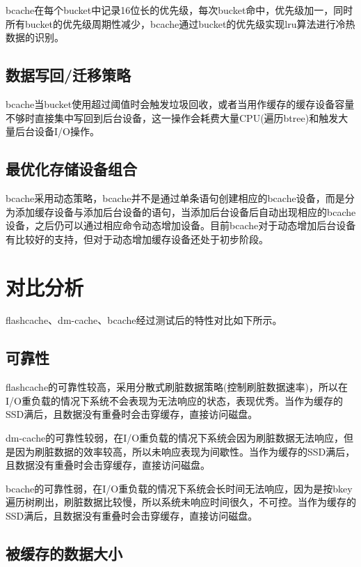 bcache在每个bucket中记录16位长的优先级，每次bucket命中，优先级加一，同时所有bucket的优先级周期性减少，bcache通过bucket的优先级实现lru算法进行冷热数据的识别。

\subsection{数据写回/迁移策略}

bcache当bucket使用超过阈值时会触发垃圾回收，或者当用作缓存的缓存设备容量不够时直接集中写回到后台设备，这一操作会耗费大量CPU(遍历btree)和触发大量后台设备I/O操作。

\subsection{最优化存储设备组合}

bcache采用动态策略，bcache并不是通过单条语句创建相应的bcache设备，而是分为添加缓存设备与添加后台设备的语句，当添加后台设备后自动出现相应的bcache设备，之后仍可以通过相应命令动态增加设备。目前bcache对于动态增加后台设备有比较好的支持，但对于动态增加缓存设备还处于初步阶段。

\section{对比分析}

flashcache、dm-cache、bcache经过测试后的特性对比如下所示。

\subsection{可靠性}

flashcache的可靠性较高，采用分散式刷脏数据策略(控制刷脏数据速率)，所以在I/O重负载的情况下系统不会表现为无法响应的状态，表现优秀。当作为缓存的SSD满后，且数据没有重叠时会击穿缓存，直接访问磁盘。 

dm-cache的可靠性较弱，在I/O重负载的情况下系统会因为刷脏数据无法响应，但是因为刷脏数据的效率较高，所以未响应表现为间歇性。当作为缓存的SSD满后，且数据没有重叠时会击穿缓存，直接访问磁盘。 

bcache的可靠性弱，在I/O重负载的情况下系统会长时间无法响应，因为是按bkey遍历树刷出，刷脏数据比较慢，所以系统未响应时间很久，不可控。当作为缓存的SSD满后，且数据没有重叠时会击穿缓存，直接访问磁盘。

\subsection{被缓存的数据大小}


